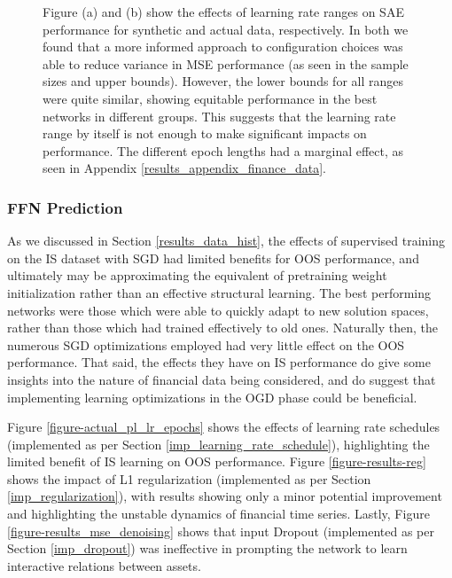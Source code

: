 \documentclass[a4paper,11pt,oneside]{article}
\theoremstyle{plain}
\theoremstyle{definition}
\begin{document}
\begin{figure}[H]
{			\newline Figure (a) and (b) show the effects of learning rate ranges on SAE performance for synthetic and actual data, respectively. In both we found that a more informed approach to configuration choices was able to reduce variance in MSE performance (as seen in the sample sizes and upper bounds). However, the lower bounds for all ranges were quite similar, showing equitable performance in the best networks in different groups. This suggests that the learning rate range by itself is not enough to make significant impacts on performance. The different epoch lengths had a marginal effect, as seen in Appendix \ref{results_appendix_finance_data}.}
		\label{figure-mse_lr}
	\end{figure}

	

	

	
	
	
	
	
	
	
	
	\newpage
	\subsubsection{FFN Prediction}
	
	As we discussed in Section \ref{results_data_hist}, the effects of supervised training on the IS dataset with SGD had limited benefits for OOS performance, and ultimately may be approximating the equivalent of pretraining weight initialization rather than an effective structural learning. The best performing networks were those which were able to quickly adapt to new solution spaces, rather than those which had trained effectively to old ones. Naturally then, the numerous SGD optimizations employed had very little effect on the OOS performance. That said, the effects they have on IS performance do give some insights into the nature of financial data being considered, and do suggest that implementing learning optimizations in the OGD phase could be beneficial. \newline
		
	Figure \ref{figure-actual_pl_lr_epochs} shows the effects of learning rate schedules (implemented as per Section \ref{imp_learning_rate_schedule}), highlighting the limited benefit of IS learning on OOS performance. Figure \ref{figure-results-reg} shows the impact of L1 regularization (implemented as per Section \ref{imp_regularization}), with results showing only a minor potential improvement and highlighting the unstable dynamics of financial time series. Lastly, Figure \ref{figure-results_mse_denoising} shows that input Dropout (implemented as per Section \ref{imp_dropout}) was ineffective in prompting the network to learn interactive relations between assets.\newline
		
\end{document}
